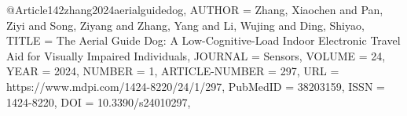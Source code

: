 @Article{142zhang2024aerialguidedog,
AUTHOR = {Zhang, Xiaochen and Pan, Ziyi and Song, Ziyang and Zhang, Yang and Li, Wujing and Ding, Shiyao},
TITLE = {The Aerial Guide Dog: A Low-Cognitive-Load Indoor Electronic Travel Aid for Visually Impaired Individuals},
JOURNAL = {Sensors},
VOLUME = {24},
YEAR = {2024},
NUMBER = {1},
ARTICLE-NUMBER = {297},
URL = {https://www.mdpi.com/1424-8220/24/1/297},
PubMedID = {38203159},
ISSN = {1424-8220},
DOI = {10.3390/s24010297},}
